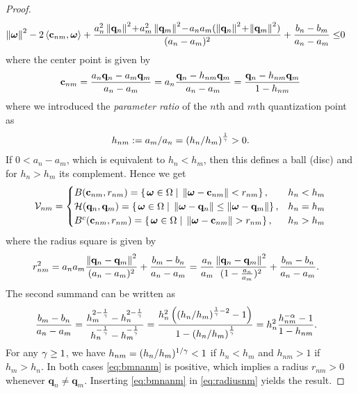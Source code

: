 \documentclass[12pt,onecolumn,journal,draftclsnofoot,letterpaper]{IEEEtran}
\renewcommand{\vp}{\mathbf q}
\newcommand{\HS}{\ensuremath{\mathcal{H}}}          %
\newcommand{\Vor}{\ensuremath{\mathcal{V}}}         %
\begin{document}
\begin{proof}
\begin{align*}
      \Norm{\vome}^2 -2 \skprod{\vc_{nm}}{\vome} + 
         \frac{a_n^2 \Norm{\vp_n}^2 \!+\!a_m^2 \Norm{\vp_m}^2 \!-\! a_na_m(\Norm{\vp_n}^2 \!+\!\Norm{\vp_m}^2)}{(a_n-a_m)^2} 
         + \frac{b_n-b_m}{a_n-a_m} \leq & 0
  \end{align*}
  where the center point is given by
  \begin{align}
    \vc_{nm}=\frac{a_n\vp_n- a_m\vp_m}{a_n-a_m}=a_n \frac{\vp_n-h_{nm} \vp_m}{a_n -a_m}=\frac{\vp_n -h_{nm}\vp_m}{1-h_{nm}} 
  \end{align}
  where we introduced the \emph{parameter ratio} of the $n$th and $m$th quantization point as
  \begin{align}
    h_{nm}:= a_m/a_n=\left(h_n /h_m\right)^{\frac{1}{\gamma}}>0.
  \end{align}
  If $0<a_n-a_m$, which is equivalent to $h_n<h_m$, then this defines a ball (disc) and for $h_n>h_m$ its complement. Hence we get
  \begin{align}
    \Vor_{nm}=\begin{cases}
      B(\vc_{nm},r_{nm})=\set{\vome\in\Omega}{\Norm{\vome-\vc_{nm}}    <  r_{nm}},&  h_n<h_m\\
      \HS(\vp_n,\vp_m) = \set{\vome\in\Omega}{ \Norm{\vome- \vp_n}\leq \Norm{\vome- \vp_m}}, &h_n=h_m\\
      B^c(\vc_{nm},r_{nm})=\set{\vome\in\Omega}{\Norm{\vome-\vc_{nm}}    >  r_{nm}},&  h_n >h_m
    \end{cases}
  \end{align}
  where the radius square is given by
  \begin{align}
    r_{nm}^2 
            &= a_na_m\frac{\Norm{\vp_n-\vp_m}^2}{(a_n-a_m)^2} + \frac{b_m-b_n}{a_n-a_m}=
            \frac{a_n}{a_m}\frac{\Norm{\vp_n-\vp_m}^2}{(1-\frac{a_n}{a_m})^2} +
            \frac{b_m-b_n}{a_n-a_m}\label{eq:radiusnm}.
  \end{align}
  The second summand can be written as
  \begin{align}
    \frac{b_m -b_n}{a_n -a_m} &
    = \frac{h_m^{2-\frac{1}{\gamma}} - h_n^{2-\frac{1}{\gamma}}}{h_n^{-\frac{1}{\gamma}}-h_m^{-\frac{1}{\gamma}}}
    = \frac{h_n^{2} \left(\left(h_n/h_m\right)^{\frac{1}{\gamma}-2} -1\right)}{1-\left(h_n/h_m\right)^{\frac{1}{\gamma}}} 
  = h_n^2 \frac{h_{nm}^{-\alpha} -1}{1-h_{nm}}
  \label{eq:bmnanm}.
  \end{align}
  For any $\gamma\geq 1$, we have $h_{nm}=(h_n/h_m)^{1/\gamma}< 1$ if $h_n<h_m$ and $h_{nm}>1$ if $h_m>h_n$.  In
  both cases \eqref{eq:bmnanm} is positive, which implies a radius
  $r_{nm}>0$ whenever $\vp_n\not=\vp_m$. Inserting \eqref{eq:bmnanm} in \eqref{eq:radiusnm} yields the result. 
\end{proof}
\end{document}

